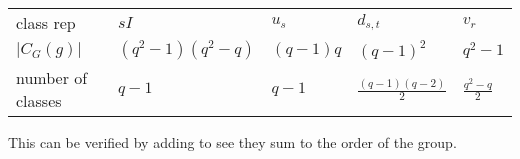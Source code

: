 \documentclass[12pt,twoside]{reedthesis}
\begin{document}
\begin{table}[h]
\begin{tabular}{l|llll}
       &    &    &     &    \\ \hline
class rep  & $sI$ & $u_s$ & $d_{s,t}$ & $v_r$ \\
$|C_G(g)|$     & $(q^2-1)(q^2-q)$  & $(q-1)q$  & $(q-1)^2$   &  $q^2-1$ \\
number of classes & $q-1$ &  $q-1$  & $\frac{(q-1)(q-2)}{2}$   & $\frac{q^2-q}{2}$ 
\end{tabular}
\end{table}


This can be verified by adding to see they sum to the order of the group.
\end{document}
